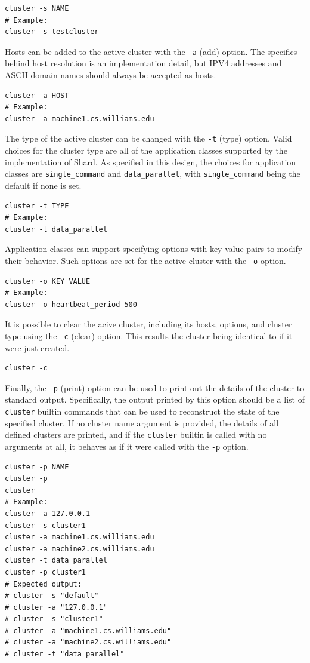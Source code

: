 \documentclass[twoside]{report}
\begin{document}
\begin{lstlisting}[language=Shard]
cluster -s NAME
# Example:
cluster -s testcluster
\end{lstlisting}

Hosts can be added to the active cluster with the \texttt{-a} (add) option.
The specifics behind host resolution is an implementation detail, but IPV4 addresses and ASCII domain names should always be accepted as hosts.

\begin{lstlisting}[language=Shard]
cluster -a HOST
# Example:
cluster -a machine1.cs.williams.edu
\end{lstlisting}

The type of the active cluster can be changed with the \texttt{-t} (type) option.
Valid choices for the cluster type are all of the application classes supported by the implementation of Shard.
As specified in this design, the choices for application classes are \texttt{single\_command} and \texttt{data\_parallel}, with \texttt{single\_command} being the default if none is set.

\begin{lstlisting}[language=Shard]
cluster -t TYPE
# Example:
cluster -t data_parallel
\end{lstlisting}

Application classes can support specifying options with key-value pairs to modify their behavior. Such options are set for the active cluster with the \texttt{-o} option.

\begin{lstlisting}[language=Shard]
cluster -o KEY VALUE
# Example:
cluster -o heartbeat_period 500
\end{lstlisting}

It is possible to clear the acive cluster, including its hosts, options, and cluster type using the \texttt{-c} (clear) option.
This results the cluster being identical to if it were just created.

\begin{lstlisting}[language=Shard]
cluster -c
\end{lstlisting}

Finally, the \texttt{-p} (print) option can be used to print out the details of the cluster to standard output.
Specifically, the output printed by this option should be a list of \texttt{cluster} builtin commands that can be used to reconstruct the state of the specified cluster.
If no cluster name argument is provided, the details of all defined clusters are printed, and if the \texttt{cluster} builtin is called with no arguments at all, it behaves as if it were called with the \texttt{-p} option.
\begin{lstlisting}[language=Shard]
cluster -p NAME
cluster -p
cluster
# Example:
cluster -a 127.0.0.1
cluster -s cluster1
cluster -a machine1.cs.williams.edu
cluster -a machine2.cs.williams.edu
cluster -t data_parallel
cluster -p cluster1
# Expected output:
# cluster -s "default"
# cluster -a "127.0.0.1"
# cluster -s "cluster1"
# cluster -a "machine1.cs.williams.edu"
# cluster -a "machine2.cs.williams.edu"
# cluster -t "data_parallel"
\end{lstlisting}
\end{document}
